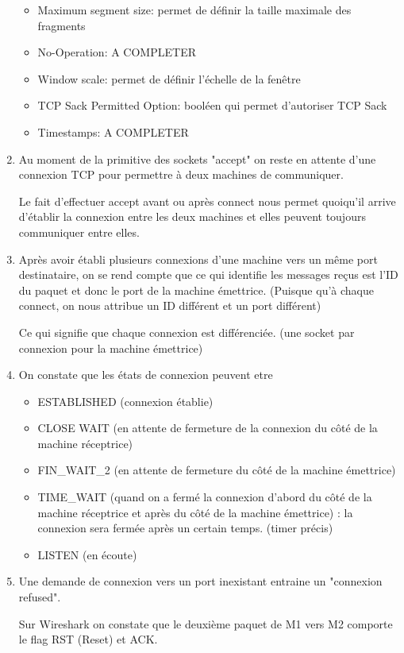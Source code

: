 \documentclass{article}
\begin{document}
\begin{enumerate}[resume]
\begin{itemize}
	\item Maximum segment size: permet de définir la taille maximale des fragments
	\item No-Operation: A COMPLETER
	\item Window scale: permet de définir l'échelle de la fenêtre
	\item TCP Sack Permitted Option: booléen qui permet d'autoriser TCP Sack
	\item Timestamps: A COMPLETER
\end{itemize}

	\item Au moment de la primitive des sockets "accept" on reste en attente d'une connexion TCP pour permettre à deux machines de communiquer.

Le fait d'effectuer accept avant ou après connect nous permet quoiqu'il arrive d'établir la connexion entre les deux machines et elles peuvent toujours communiquer entre elles.

	\item Après avoir établi plusieurs connexions d'une machine vers un même port destinataire, on se rend compte que ce qui identifie les messages reçus est l'ID du paquet et donc le port de la machine émettrice. (Puisque qu'à chaque connect, on nous attribue un ID différent et un port différent)

Ce qui signifie que chaque connexion est différenciée. (une socket par connexion pour la machine émettrice)

	\item On constate que les états de connexion peuvent etre 

	\begin{itemize}
		\item ESTABLISHED (connexion établie)
		\item CLOSE WAIT (en attente de fermeture de la connexion du côté de la machine réceptrice)
		\item  FIN\_WAIT\_2 (en attente de fermeture du côté de la machine émettrice)
		\item TIME\_WAIT (quand on a fermé la connexion d'abord du côté de la machine réceptrice et après du côté de la machine émettrice) : la connexion sera fermée après un certain temps. (timer précis)
		\item LISTEN (en écoute)
	\end{itemize}


	\item Une demande de connexion vers un port inexistant entraine un "connexion refused".

Sur Wireshark on constate que le deuxième paquet de M1 vers M2 comporte le flag RST (Reset) et ACK.

\end{enumerate}
\end{document}
